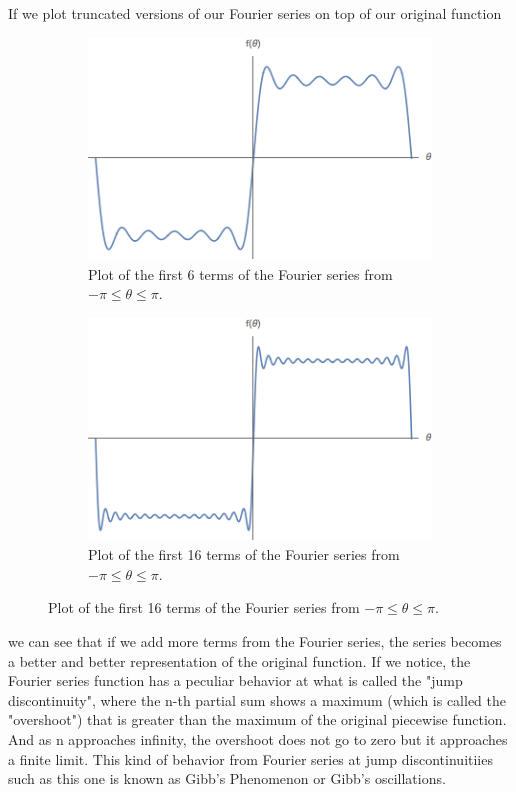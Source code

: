 \documentclass{article}
\begin{document}
If we plot truncated versions of our Fourier series on top of our original function
\begin{figure}[h]
  \centering
  \begin{subfigure}[b]{0.4\textwidth}
    \includegraphics[width=\textwidth]{figures/Sin_0_to_5.png}
    \caption{Plot of the first 6 terms of the Fourier series from $- \pi \leq \theta \leq \pi$.}
  \end{subfigure}
  \hspace{1cm}
  \begin{subfigure}[b]{0.4\textwidth}
    \includegraphics[width=\textwidth]{figures/Sin_0_to_15.png}
    \caption{Plot of the first 16 terms of the Fourier series from $- \pi \leq \theta \leq \pi$.}
  \end{subfigure}
\end{figure}
we can see that if we add more terms from the Fourier series, the series becomes a better and better representation of the original function.
If we notice, the Fourier series function has a peculiar behavior at what is called the "jump discontinuity", where the n-th partial sum shows a maximum (which is called the "overshoot") that is greater than the maximum of the original piecewise function.
And as n approaches infinity, the overshoot does not go to zero but it approaches a finite limit.
This kind of behavior from Fourier series at jump discontinuitiies such as this one is known as Gibb's Phenomenon or Gibb's oscillations.
\end{document}
